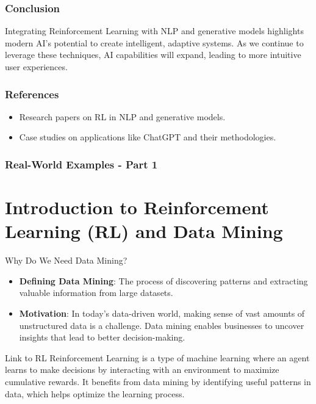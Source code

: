 \documentclass[aspectratio=169]{beamer}
\begin{document}
\begin{frame}[fragile]
    \frametitle{Conclusion}
    Integrating Reinforcement Learning with NLP and generative models highlights modern AI's potential to create intelligent, adaptive systems. 
    As we continue to leverage these techniques, AI capabilities will expand, leading to more intuitive user experiences.
\end{frame}

\begin{frame}[fragile]
    \frametitle{References}
    \begin{itemize}
        \item Research papers on RL in NLP and generative models.
        \item Case studies on applications like ChatGPT and their methodologies.
    \end{itemize}
\end{frame}

\begin{frame}[fragile]
    \frametitle{Real-World Examples - Part 1}
    \section*{Introduction to Reinforcement Learning (RL) and Data Mining}
    
    \begin{block}{Why Do We Need Data Mining?}
        \begin{itemize}
            \item \textbf{Defining Data Mining}: The process of discovering patterns and extracting valuable information from large datasets.
            \item \textbf{Motivation}: In today’s data-driven world, making sense of vast amounts of unstructured data is a challenge. Data mining enables businesses to uncover insights that lead to better decision-making.
        \end{itemize}
    \end{block}
    
    \begin{block}{Link to RL}
        Reinforcement Learning is a type of machine learning where an agent learns to make decisions by interacting with an environment to maximize cumulative rewards. It benefits from data mining by identifying useful patterns in data, which helps optimize the learning process.
    \end{block}
\end{frame}
\end{document}
